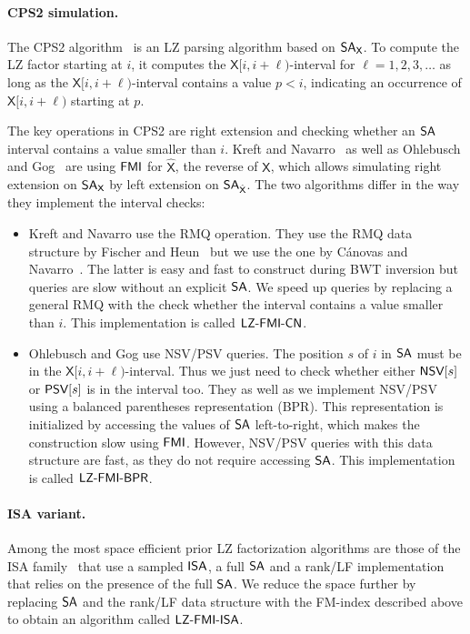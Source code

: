 \documentclass[runningheads]{llncs}
\def\reverse#1{\hat{#1}}
\def\SA{\mbox{\rm {\sf SA}}}
\def\ISA{\mbox{\rm {\sf ISA}}}
\def\FMI{\mbox{\rm {\sf FMI}}}
\def\X{\textsf{X}}
\def\NSV{\mbox{\rm {\sf NSV}}}
\def\PSV{\mbox{\rm {\sf PSV}}}
\def\LZFMICN{\mbox{\sf LZ-FMI-CN}}
\def\LZFMIBPR{\mbox{\sf LZ-FMI-BPR}}
\def\LZFMIISA{\mbox{\sf LZ-FMI-ISA}}
\begin{document}
\paragraph{CPS2 simulation.} The CPS2 algorithm~\cite{cps2008} is an
LZ parsing algorithm based on $\SA_{\X}$. To compute the LZ factor
starting at $i$, it computes the $\X[i,i+\ell)$-interval for
$\ell=1,2,3,\ldots$ as long as the $\X[i,i+\ell)$-interval contains a
value $p<i$, indicating an occurrence of $\X[i,i+\ell)$ starting at $p$.

The key operations in CPS2 are right extension and checking
whether an $\SA$ interval contains a value smaller than $i$.  Kreft
and Navarro~\cite{kn2010} as well as Ohlebusch and Gog~\cite{og2011}
are using $\FMI$ for $\reverse{\X}$, the reverse of $\X$, 
which allows simulating right extension
on $\SA_{\X}$ by left extension on $\SA_{\reverse{\X}}$. The
two algorithms differ in the way they implement the interval checks:
\begin{itemize}
\item Kreft and Navarro use the RMQ operation. They use the RMQ data
  structure by Fischer and Heun~\cite{fh2007} but we use the one by
  C{\'a}novas and Navarro~\cite{cn2010}. The latter is easy and fast to
  construct during BWT inversion but queries are slow without an
  explicit $\SA$. We speed up queries by replacing a general RMQ with
  the check whether the interval contains a value smaller than $i$.
  This implementation is called $\LZFMICN$.
\item Ohlebusch and Gog use NSV/PSV queries. The position $s$ of $i$
  in $\SA$ must be in the $\X[i,i+\ell)$-interval. Thus we just need
  to check whether either $\NSV[s]$ or $\PSV[s]$ is in the interval
  too. They as well as we implement NSV/PSV using a balanced
  parentheses representation (BPR). This representation is initialized
  by accessing the values of $\SA$ left-to-right, which makes the
  construction slow using $\FMI$. However, NSV/PSV queries with this data
  structure are fast, as they do not require accessing $\SA$.
  This implementation is called $\LZFMIBPR$.
\end{itemize}

\paragraph{ISA variant.} Among the most space efficient prior LZ
factorization algorithms are those of the ISA
family~\cite{kp2013} that use a sampled $\ISA$, a full $\SA$ and a
rank/LF implementation that relies on the presence of the full
$\SA$. We reduce the space further by replacing $\SA$ and the rank/LF
data structure with the FM-index described above to obtain an
algorithm called $\LZFMIISA$.
\end{document}
